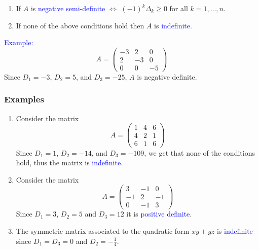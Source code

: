 \documentclass[11pt,aspectratio=169]{beamer}
\begin{document}
\begin{frame}
\begin{small}
\begin{enumerate}
\item If $A$ is \textcolor{blue}{negative semi-definite} $\Longleftrightarrow$ $(-1)^k \Delta _k\geq 0$ for all $k=1,...,n$.

\item If none of the above conditions hold then $A$ is \textcolor{blue}{indefinite}.
\end{enumerate}
 \textcolor{blue}{Example:}
$$A=\begin{pmatrix} -3 & 2 & 0 \\ 2 & -3 & 0 \\ 0& 0 & -5\end{pmatrix}$$
Since $D_1=-3$, $D_2=5$, and $D_3=-25$, $A$ is negative definite.


\end{small}
\end{frame}

\begin{frame}
\frametitle{Examples}
\begin{small}
\begin{enumerate}
\item Consider the matrix $$A=\begin{pmatrix} 1 & 4 & 6 \\ 4 & 2 & 1 \\ 6& 1 & 6\end{pmatrix}$$
Since $D_1=1$, $D_2=-14$, and $D_3=-109$, we get that none of the conditions hold, thus the matrix is \textcolor{blue}{indefinite}.

\item Consider the matrix $$A=\begin{pmatrix} 3 & -1 & 0 \\ -1 & 2 & -1 \\ 0& -1 & 3\end{pmatrix}$$
Since $D_1=3$, $D_2=5$ and $D_3=12$ it is \textcolor{blue}{positive definite}.

\item The symmetric matrix associated to the quadratic form $xy+yz$ is \textcolor{blue}{indefinite}
since $D_1=D_3=0$ and $D_2=-\frac{1}{4}$.
\end{enumerate}

\end{small}
\end{frame}
\end{document}
